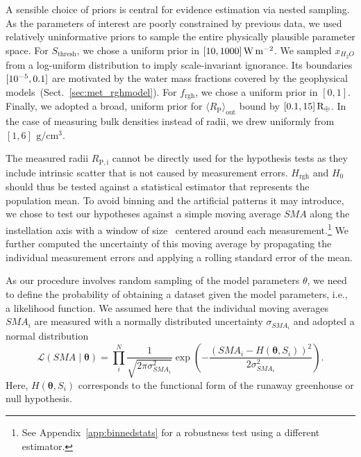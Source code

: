 \documentclass[twocolumn]{aastex631}
\begin{document}
A sensible choice of priors is central for evidence estimation via nested sampling.
As the parameters of interest are poorly constrained by previous data, we used relatively uninformative priors to sample the entire physically plausible parameter space.
For $S_\mathrm{thresh}$, we chose a uniform prior in $[10,1000]\, \SI{}{\watt\per\meter\squared}$.
We sampled $x_{H_2O}$ from a log-uniform distribution to imply scale-invariant ignorance.
Its boundaries $[10^{-5}, 0.1]$ are motivated by the water mass fractions covered by the geophysical models~(Sect.~\ref{sec:met_rghmodel}).
For $f_\mathrm{rgh}$, we chose a uniform prior in $[0, 1]$.
Finally, we adopted a broad, uniform prior for $\langle R_\mathrm{P}\rangle_\mathrm{out}$ bound by $[0.1, 15] \, \mathrm{R_\oplus}$.
In the case of measuring bulk densities instead of radii, we drew uniformly from $[1, 6] \, \SI{}{\gram\per\centi\meter\cubed}$.

The measured radii $R_\mathrm{P, i}$ cannot be directly used for the hypothesis tests as they include intrinsic scatter that is not caused by measurement errors.
$H_{\mathrm{rgh}}$ and $H_0$ should thus be tested against a statistical estimator that represents the population mean.
To avoid binning and the artificial patterns it may introduce, we chose to test our hypotheses against a simple moving average $SMA$ along the instellation axis with a window of size \windowsize\ centered around each measurement.\footnote{See Appendix~\ref{app:binnedstats} for a robustness test using a different estimator.}
We further computed the uncertainty of this moving average by propagating the individual measurement errors and applying a rolling standard error of the mean. 

As our procedure involves random sampling of the model parameters $\theta$, we need to define the probability of obtaining a dataset given the model parameters, i.e., a likelihood function.
We assumed here that the individual moving averages $SMA_i$ are measured with a normally distributed uncertainty $\sigma_{SMA_i}$ and adopted a normal distribution
\begin{equation}
    \mathcal{L}(SMA \mid \boldsymbol{\theta})=\prod_{i}^{N} \frac{1}{\sqrt{2 \pi \sigma_{SMA_i}^{2}}} \exp \left(-\frac{\left(SMA_i - H\left(\boldsymbol{\theta}, S_i\right)\right)^{2}}{2 \sigma_{SMA_i}^{2}}\right).
\end{equation}
Here, $H\left(\boldsymbol{\theta}, S_i\right)$ corresponds to the functional form of the runaway greenhouse or null hypothesis.
\end{document}

